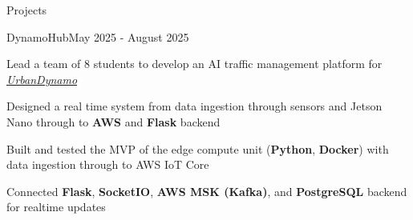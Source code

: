 \documentclass[
	11pt, %
]{resume} %
\begin{document}
\begin{rSection}{Projects}



	\begin{rSubsection}{DynamoHub}{May 2025 - August 2025}{}{}
		\item Lead a team of 8 students to develop an AI traffic management platform for \textit{\href{https://urbandynamo.com}{UrbanDynamo}}
		\item Designed a real time system from data ingestion through sensors and Jetson Nano through to \textbf{AWS} and \textbf{Flask} backend
		\item Built and tested the MVP of the edge compute unit (\textbf{Python}, \textbf{Docker}) with data ingestion through to AWS IoT Core
		\item Connected \textbf{Flask}, \textbf{SocketIO}, \textbf{AWS MSK (Kafka)}, and \textbf{PostgreSQL} backend for realtime updates
	\end{rSubsection}

\end{rSection}

%
%
\end{document}
